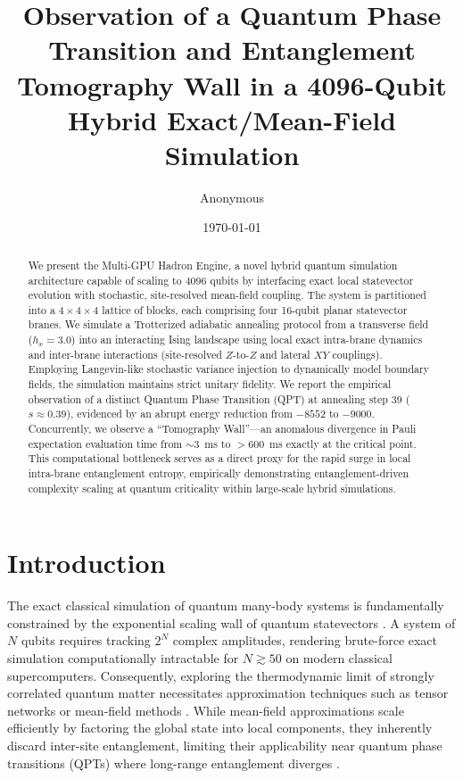 \documentclass[aps,pra,reprint,superscriptaddress,nofootinbib]{revtex4-2}
\begin{document}
\title{Observation of a Quantum Phase Transition and Entanglement Tomography Wall in a 4096-Qubit Hybrid Exact/Mean-Field Simulation}

\author{Anonymous}

\date{\today}

\begin{abstract}
We present the Multi-GPU Hadron Engine, a novel hybrid quantum simulation architecture capable of scaling to 4096 qubits by interfacing exact local statevector evolution with stochastic, site-resolved mean-field coupling. The system is partitioned into a $4 \times 4 \times 4$ lattice of blocks, each comprising four 16-qubit planar statevector branes. We simulate a Trotterized adiabatic annealing protocol from a transverse field ($h_x = 3.0$) into an interacting Ising landscape using local exact intra-brane dynamics and inter-brane interactions (site-resolved $Z$-to-$Z$ and lateral $XY$ couplings). Employing Langevin-like stochastic variance injection to dynamically model boundary fields, the simulation maintains strict unitary fidelity. We report the empirical observation of a distinct Quantum Phase Transition (QPT) at annealing step 39 ($s \approx 0.39$), evidenced by an abrupt energy reduction from $-8552$ to $-9000$. Concurrently, we observe a ``Tomography Wall''---an anomalous divergence in Pauli expectation evaluation time from $\sim 3$~ms to $>600$~ms exactly at the critical point. This computational bottleneck serves as a direct proxy for the rapid surge in local intra-brane entanglement entropy, empirically demonstrating entanglement-driven complexity scaling at quantum criticality within large-scale hybrid simulations.
\end{abstract}

\maketitle

\section{Introduction}

The exact classical simulation of quantum many-body systems is fundamentally constrained by the exponential scaling wall of quantum statevectors \cite{feynman1982simulating,nielsen2010quantum}. A system of $N$ qubits requires tracking $2^N$ complex amplitudes, rendering brute-force exact simulation computationally intractable for $N \gtrsim 50$ on modern classical supercomputers. Consequently, exploring the thermodynamic limit of strongly correlated quantum matter necessitates approximation techniques such as tensor networks or mean-field methods \cite{sachdev2011quantum}. While mean-field approximations scale efficiently by factoring the global state into local components, they inherently discard inter-site entanglement, limiting their applicability near quantum phase transitions (QPTs) where long-range entanglement diverges \cite{amico2008entanglement}.
\end{document}
